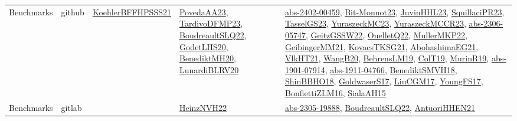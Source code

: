 {\begin{longtable}{lp{3cm}>{\raggedright}p{6cm}>{\raggedright}p{6cm}p{8cm}}
Benchmarks & github & \href{articles/KoehlerBFFHPSSS21.pdf}{KoehlerBFFHPSSS21}\cite{KoehlerBFFHPSSS21} & \href{papers/PovedaAA23.pdf}{PovedaAA23}\cite{PovedaAA23}, \href{papers/TardivoDFMP23.pdf}{TardivoDFMP23}\cite{TardivoDFMP23}, \href{papers/BoudreaultSLQ22.pdf}{BoudreaultSLQ22}\cite{BoudreaultSLQ22}, \href{papers/GodetLHS20.pdf}{GodetLHS20}\cite{GodetLHS20}, \href{articles/BenediktMH20.pdf}{BenediktMH20}\cite{BenediktMH20}, \href{articles/LunardiBLRV20.pdf}{LunardiBLRV20}\cite{LunardiBLRV20} & \href{articles/abs-2402-00459.pdf}{abs-2402-00459}\cite{abs-2402-00459}, \href{papers/Bit-Monnot23.pdf}{Bit-Monnot23}\cite{Bit-Monnot23}, \href{papers/JuvinHHL23.pdf}{JuvinHHL23}\cite{JuvinHHL23}, \href{papers/SquillaciPR23.pdf}{SquillaciPR23}\cite{SquillaciPR23}, \href{papers/TasselGS23.pdf}{TasselGS23}\cite{TasselGS23}, \href{papers/YuraszeckMC23.pdf}{YuraszeckMC23}\cite{YuraszeckMC23}, \href{articles/YuraszeckMCCR23.pdf}{YuraszeckMCCR23}\cite{YuraszeckMCCR23}, \href{articles/abs-2306-05747.pdf}{abs-2306-05747}\cite{abs-2306-05747}, \href{papers/GeitzGSSW22.pdf}{GeitzGSSW22}\cite{GeitzGSSW22}, \href{papers/OuelletQ22.pdf}{OuelletQ22}\cite{OuelletQ22}, \href{articles/MullerMKP22.pdf}{MullerMKP22}\cite{MullerMKP22}, \href{papers/GeibingerMM21.pdf}{GeibingerMM21}\cite{GeibingerMM21}, \href{papers/KovacsTKSG21.pdf}{KovacsTKSG21}\cite{KovacsTKSG21}, \href{articles/AbohashimaEG21.pdf}{AbohashimaEG21}\cite{AbohashimaEG21}, \href{articles/VlkHT21.pdf}{VlkHT21}\cite{VlkHT21}, \href{papers/WangB20.pdf}{WangB20}\cite{WangB20}, \href{papers/BehrensLM19.pdf}{BehrensLM19}\cite{BehrensLM19}, \href{papers/ColT19.pdf}{ColT19}\cite{ColT19}, \href{papers/MurinR19.pdf}{MurinR19}\cite{MurinR19}, \href{articles/abs-1901-07914.pdf}{abs-1901-07914}\cite{abs-1901-07914}, \href{articles/abs-1911-04766.pdf}{abs-1911-04766}\cite{abs-1911-04766}, \href{papers/BenediktSMVH18.pdf}{BenediktSMVH18}\cite{BenediktSMVH18}, \href{articles/ShinBBHO18.pdf}{ShinBBHO18}\cite{ShinBBHO18}, \href{papers/GoldwaserS17.pdf}{GoldwaserS17}\cite{GoldwaserS17}, \href{papers/LiuCGM17.pdf}{LiuCGM17}\cite{LiuCGM17}, \href{papers/YoungFS17.pdf}{YoungFS17}\cite{YoungFS17}, \href{papers/BonfiettiZLM16.pdf}{BonfiettiZLM16}\cite{BonfiettiZLM16}, \href{papers/SialaAH15.pdf}{SialaAH15}\cite{SialaAH15}\\
Benchmarks & gitlab &  & \href{articles/HeinzNVH22.pdf}{HeinzNVH22}\cite{HeinzNVH22} & \href{articles/abs-2305-19888.pdf}{abs-2305-19888}\cite{abs-2305-19888}, \href{papers/BoudreaultSLQ22.pdf}{BoudreaultSLQ22}\cite{BoudreaultSLQ22}, \href{papers/AntuoriHHEN21.pdf}{AntuoriHHEN21}\cite{AntuoriHHEN21}\\

\end{longtable}}

